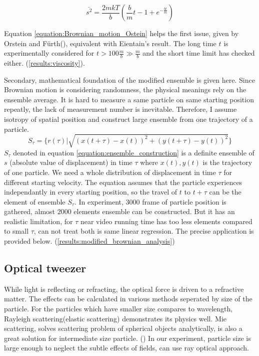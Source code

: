 \documentclass{article}
\begin{document}
\begin{equation}
    \bar{s^2} = \frac{2 m k T}{b} (\frac{b}{m}t -1 + e^{-\frac{bt}{m}})
\label{equation:Brownian_motion_Ostein}
\end{equation}

Equation \ref{equation:Brownian_motion_Ostein} helps the first issue, given by Orstein and F{\"u}rth(\cite{Brownian_motion_1}), equivalent with Eientain's result.
The long time $t$ is experimentally considered for $t > 100 \frac{m}{b} \gg \frac{m}{b}$ and the short time limit has checked either. (\ref{results:viscosity}).

Secondary, mathematical foundation of the modified ensemble is given here.
Since Brownian motion is considering randomness, the physical meanings rely on the ensemble average.
It is hard to measure a same particle on same starting position repeatly, the lack of measurement number is inevitable.
Therefore, I assume isotropy of spatial position and construct large ensemble from one trajectory of a particle.
\begin{equation}
    S_\tau = \{ r(\tau)|\sqrt{(x(t+\tau)-x(t))^2+(y(t+\tau)-y(t))^2} \}
    \label{equation:ensemble_construction}
\end{equation}
$S_\tau$ denoted in equation \ref{equation:ensemble_construction} is a definite ensemble of $s$ (absolute value of displacement) in time $\tau$ where $x(t), y(t)$ is the trajectory of one particle.
We need a whole distribution of displacement in time $\tau$ for different starting velocity.
The equation assumes that the particle experiences independantly in every starting position, so the travel of $t$ to $t+\tau$ can be the element of ensemble $S_\tau$.
In experiment, $3000$ frame of particle position is gathered, almost $2000$ elements ensemble can be constructed.
But it has an realistic limitation, for $\tau$ near video running time has too less elements compared to small $\tau$, can not treat both is same linear regression.
The precise application is provided below. (\ref{results:modified_brownian_analysis})


\subsection{Optical tweezer}
\label{intro:optical_tweezer}
While light is reflecting or refracting, the optical force is driven to a refractive matter.
The effects can be calculated in various methods seperated by size of the particle.
For the particles which have smaller size compares to wavelength, Rayleigh scattering(elastic scattering) demonstrates its physics well.
Mie scattering, solves scattering problem of spherical objects analytically, is also a great solution for intermediate size particle. (\cite{T_matrix})
In our experiment, particle size is large enough to neglect the subtle effects of fields, can use ray optical approach.
\end{document}
